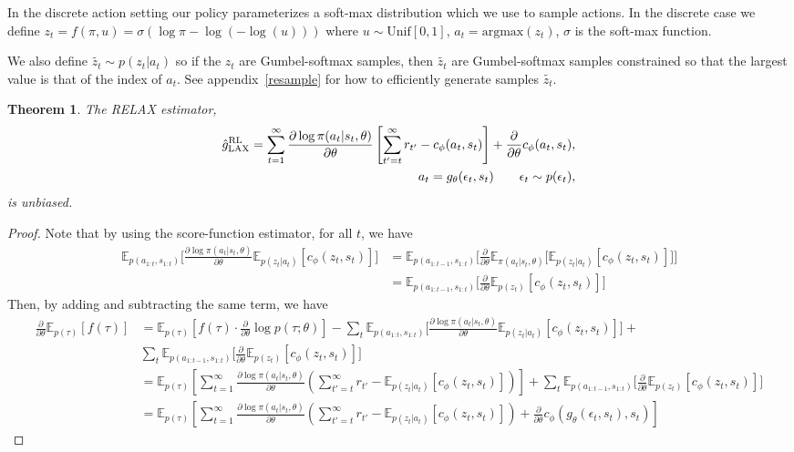 \documentclass{article}
\newcommand{\E}{\mathbb{E}}
\newcommand{\LL}[1]{\frac{\partial \log \pi(a_{#1}| s_{#1}, \theta)}{\partial \theta}}
\newcommand{\PT}{\frac{\partial}{\partial \theta}}
\newcommand{\LP}[1]{\PT \log p(#1)}
\newcommand{\LAX}{{\textnormal{LAX}}}
\newcommand{\RL}{{\textnormal{RL}}}
\newcommand{\RELAX}{{\textnormal{RELAX}}}
\newtheorem{theorem}{Theorem}[section]
\begin{document}
In the discrete action setting our policy parameterizes a soft-max distribution which we use to sample actions. 
In the discrete case we define $z_t = f(\pi, u) = \sigma (\log\pi - \log(-\log(u)))$ where $u\sim \text{Unif}[0, 1]$, $a_t = \text{argmax}(z_t)$, $\sigma$ is the soft-max function.

We also define $\tilde{z_t} \sim p(z_t|a_t)$ so if the $z_t$ are Gumbel-softmax samples, then $\tilde{z_t}$ are Gumbel-softmax samples constrained so that the largest value is that of the index of $a_t$.
See appendix~\ref{resample} for how to efficiently generate samples $\tilde{z_t}$. 
\begin{theorem}
The \RELAX{} estimator,
\begin{align}
\hat g_\LAX^{\RL} = \sum_{t=1}^{\infty} \LL{t} \left[ \sum_{t'=t}^{\infty} r_{t'} - c_\phi(a_t,s_t) \right] +\frac{\partial}{\partial\theta} c_\phi(a_t, s_t), \\
a_t = g_\theta(\epsilon_t,s_t) \qquad \epsilon_t \sim p(\epsilon_t)\nonumber,
\end{align}
is unbiased.
\end{theorem}
\begin{proof}
Note that by using the score-function estimator, for all $t$, we have 
%
\begin{align*}
\E_{p(a_{1:t},s_{1:t})}\Big[\LL{t} \E_{p(z_t|a_t)}[c_\phi(z_t, s_t)]\Big] &= \E_{p(a_{1:t-1},s_{1:t})}\Big[\frac{\partial}{\partial\theta}\E_{\pi(a_t|s_t, \theta)}\Big[\E_{p(z_t|a_t)}[c_\phi(z_t, s_t)]\Big]\Big]\\
&=\E_{p(a_{1:t-1},s_{1:t})}\Big[\frac{\partial}{\partial\theta}\E_{p(z_t)}[c_\phi(z_t, s_t)]\Big]
\end{align*}
Then, by adding and subtracting the same term, we have
\begin{align*}
\PT\E_{p(\tau)}[f(\tau)] &= \E_{p(\tau)}\left[f(\tau)\cdot\LP{\tau;\theta}\right]-\sum_t\E_{p(a_{1:t},s_{1:t})}\Big[\LL{t} \E_{p(z_t|a_t)}[c_\phi(z_t, s_t)]\Big]+\\
&\sum_t\E_{p(a_{1:t-1},s_{1:t})}\Big[\frac{\partial}{\partial\theta}\E_{p(z_t)}[c_\phi(z_t, s_t)]\Big]\nonumber\\
&= \E_{p(\tau)}\left[ \sum_{t=1}^{\infty} \LL{t}\left(\sum_{t'=t}^{\infty} r_{t'} - \E_{p(z_t|a_t)}[c_\phi(z_t, s_t)]\right)\right]+\sum_t\E_{p(a_{1:t-1},s_{1:t})}\Big[\frac{\partial}{\partial\theta}\E_{p(z_t)}[c_\phi(z_t, s_t)]\Big]\nonumber\\
&= \E_{p(\tau)}\left[ \sum_{t=1}^{\infty} \LL{t}\left(\sum_{t'=t}^{\infty} r_{t'} - \E_{p(z_t|a_t)}[c_\phi(z_t, s_t)]\right)+\frac{\partial}{\partial\theta}c_\phi(g_\theta(\epsilon_t,s_t), s_t)\right]\nonumber
\end{align*}
\end{proof}
\end{document}
